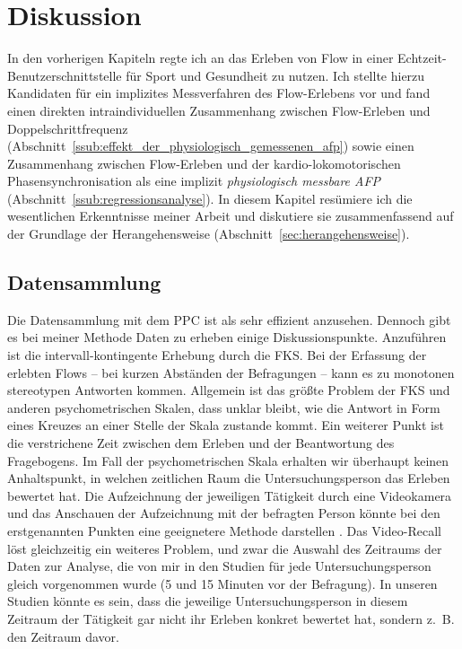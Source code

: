 

\chapter{Diskussion} \label{cha:diskussion} In den vorherigen Kapiteln regte ich an das Erleben von Flow in einer Echtzeit-Benutzerschnittstelle für Sport und Gesundheit zu nutzen. Ich stellte hierzu Kandidaten für ein implizites Messverfahren des Flow-Erlebens vor und fand einen direkten intraindividuellen Zusammenhang zwischen Flow-Erleben und Doppelschrittfrequenz (Abschnitt~\ref{ssub:effekt_der_physiologisch_gemessenen_afp}) sowie einen Zusammenhang zwischen Flow-Erleben und der kardio-lokomotorischen Phasensynchronisation als eine implizit \emph{physiologisch messbare \ac{AFP}} (Abschnitt~\ref{ssub:regressionsanalyse}). In diesem Kapitel resümiere ich die wesentlichen Erkenntnisse meiner Arbeit und diskutiere sie zusammenfassend auf der Grundlage der Herangehensweise (Abschnitt~\ref{sec:herangehensweise}). 

\section{Datensammlung} 

\label{sec:datensammlung}

Die Datensammlung mit dem \ac{PPC} ist als sehr effizient anzusehen. Dennoch gibt es bei meiner Methode Daten zu erheben einige Diskussionspunkte. Anzuführen ist die intervall-kontingente Erhebung durch die \ac{FKS}. Bei der Erfassung der erlebten Flows -- bei kurzen Abständen der Befragungen -- kann es zu monotonen stereotypen Antworten kommen. Allgemein ist das größte Problem der \ac{FKS} und anderen psychometrischen Skalen, dass unklar bleibt, wie die Antwort in Form eines Kreuzes an einer Stelle der Skala zustande kommt. Ein weiterer Punkt ist die verstrichene Zeit zwischen dem Erleben und der Beantwortung des Fragebogens. Im Fall der psychometrischen Skala erhalten wir überhaupt keinen Anhaltspunkt, in welchen zeitlichen Raum die Untersuchungsperson das Erleben bewertet hat. Die Aufzeichnung der jeweiligen Tätigkeit durch eine Videokamera und das Anschauen der Aufzeichnung mit der befragten Person könnte bei den erstgenannten Punkten eine geeignetere Methode darstellen \citep[Video-Recall,][S.~566]{Leuchter2006}. Das Video-Recall löst gleichzeitig ein weiteres Problem, und zwar die Auswahl des Zeitraums der Daten zur Analyse, die von mir in den Studien für jede Untersuchungsperson gleich vorgenommen wurde (5 und 15 Minuten vor der Befragung). In unseren Studien könnte es sein, dass die jeweilige Untersuchungsperson in diesem Zeitraum der Tätigkeit gar nicht ihr Erleben konkret bewertet hat, sondern z.~B. den Zeitraum davor. 

